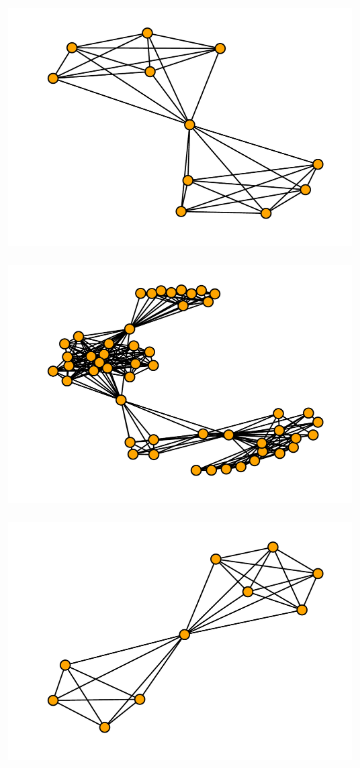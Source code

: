 \documentclass{article}
\begin{document}
\begin{figure}[!hbtp]
    \begin{subfigure}{0.3\textwidth}
        \includegraphics[width=\textwidth]{./assets/images/coauthor00.pdf}
    \end{subfigure}
    \begin{subfigure}{0.3\textwidth}
        \includegraphics[width=\textwidth]{./assets/images/coauthor01.pdf}
    \end{subfigure}
    \begin{subfigure}{0.3\textwidth}
        \includegraphics[width=\textwidth]{./assets/images/coauthor02.pdf}

\end{subfigure}
\end{figure}
\end{document}
